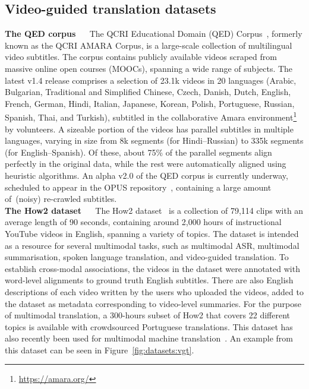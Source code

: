 \documentclass{svjour3}
\newcommand{\element}[1]{\noindent\textbf{#1} ~~}
\begin{document}
    \subsection{Video-guided translation datasets}
    \label{sec:datasets:vgt}
    
\element{The QED corpus}
            The QCRI Educational Domain (QED) Corpus~\citep{guzman-amara-2013,abdelali-amara-2014}, formerly known as the QCRI AMARA Corpus, is a large-scale collection of multilingual video subtitles. The corpus contains publicly available videos scraped from massive online open courses (MOOCs), spanning a wide range of subjects. The latest v1.4 release comprises a selection of 23.1k videos in 20 languages (Arabic, Bulgarian, Traditional and Simplified Chinese, Czech, Danish, Dutch, English, French, German, Hindi, Italian, Japanese, Korean, Polish, Portuguese, Russian, Spanish, Thai, and Turkish), subtitled in the collaborative Amara environment\footnote{\url{https://amara.org/}}~\citep{jansen-amara-2014} by volunteers. A sizeable portion of the videos has parallel subtitles in multiple languages, varying in size from 8k segments (for Hindi--Russian) to 335k segments (for English--Spanish). Of these, about 75\% of the parallel segments align perfectly in the original data, while the rest were automatically aligned using heuristic algorithms. An alpha v2.0 of the QED corpus is currently underway, scheduled to appear in the OPUS repository~\citep{tiedemann-parallel-2016}, containing a large amount of~(noisy) re-crawled subtitles. \\
  



        \element{The How2 dataset}
            The How2 dataset~\citep{sanabria-how2:-2018} is a collection of 79,114 clips with an average length of 90 seconds, containing around 2,000 hours of instructional YouTube videos in English, spanning a variety of topics. The dataset is intended as a resource for several multimodal tasks, such as multimodal ASR, multimodal summarisation, spoken language translation, and video-guided translation. To establish cross-modal associations, the videos in the dataset were annotated with word-level alignments to ground truth English subtitles. There are also English descriptions of each video written by the users who uploaded the videos, added to the dataset as metadata corresponding to video-level summaries. For the purpose of multimodal translation, a 300-hours subset of How2 that covers 22 different topics is available with crowdsourced Portuguese translations. This dataset has also recently been used for multimodal machine translation~\citep{sanabria-how2:-2018, wu2019}. An example from this dataset can be seen in Figure~\ref{fig:datasets:vgt}. \\
        
\end{document}
